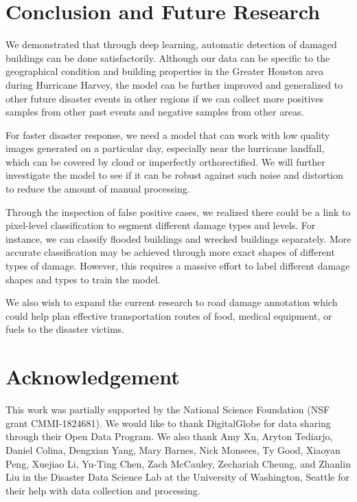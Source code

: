 \documentclass[journal, 12pt, onecolumn,draftclsnofoot]{IEEEtran}
\begin{document}
\section{Conclusion and Future Research}\label{sec:conclusion}
We demonstrated that through deep learning, automatic detection of damaged buildings can be done satisfactorily. Although our data can be specific to the geographical condition and building properties in the Greater Houston area during Hurricane Harvey, the model can be further improved and generalized to other future disaster events in other regions if we can collect more positives samples from other past events and negative samples from other areas. 

For faster disaster response, we need a model that can work with low quality images generated on a particular day, especially near the hurricane landfall, which can be covered by cloud or imperfectly orthorectified. We will further investigate the model to see if it can be robust against such noise and distortion to reduce the amount of manual processing.


Through the inspection of false positive cases, we realized there could be a link to pixel-level classification to segment different damage types and levels. For instance, we can classify flooded buildings and wrecked buildings separately. More accurate classification may be achieved through more exact shapes of different types of damage. However, this requires a massive effort to label different damage shapes and types to train the model. 

We also wish to expand the current research to road damage annotation which could help plan effective transportation routes of food, medical equipment, or fuels to the disaster victims. 


\section*{Acknowledgement}
This work was partially supported by the National Science Foundation (NSF grant CMMI-1824681). We would like to thank DigitalGlobe for data sharing through their Open Data Program. We also thank Amy Xu, Aryton Tediarjo, Daniel Colina, Dengxian Yang, Mary Barnes, Nick Monsees, Ty Good, Xiaoyan Peng, Xuejiao Li, Yu-Ting Chen, Zach McCauley, Zechariah Cheung, and Zhanlin Liu in the Disaster Data Science Lab at the University of Washington, Seattle for their help with data collection and processing. 
\appendices
\end{document}
